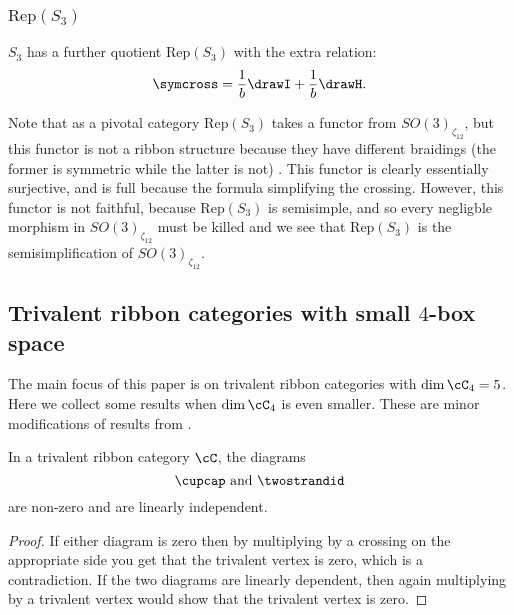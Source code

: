 \documentclass[12pt]{amsart}
\begin{document}
\subsubsection{$\text{Rep}(S_3)$}


\begin{definition}
$S_{3}$ has a further quotient $\mathrm{Rep}(S_3)$ with the extra relation:
$$\symcross = \frac{1}{b}\drawI + \frac{1}{b}\drawH.$$
\end{definition}

Note that as a pivotal category $\mathrm{Rep}(S_3)$ takes a functor from $SO(3)_{\zeta_{12}}$, but this functor is not a ribbon structure because they have different braidings (the former is symmetric while the latter is not) \cite[Ex. 8.6]{MR3624901}.  This functor is clearly essentially surjective, and is full because the formula simplifying the crossing.  However, this functor is not faithful, because $\mathrm{Rep}(S_3)$ is semisimple, and so every negligble morphism in $SO(3)_{\zeta_{12}}$ must be killed and we see that $\mathrm{Rep}(S_3)$ is the semisimplification of $SO(3)_{\zeta_{12}}$.

\subsection{Trivalent ribbon categories with small $4$-box space}

The main focus of this paper is on trivalent ribbon categories with $\dim \cC_4 = 5$.  Here we collect some results when $\dim \cC_4$ is even smaller.  These are minor modifications of results from \cite{MR3624901}.

\begin{lemma}
In a trivalent ribbon category $\cC$, the diagrams
$$\cupcap \text{ and } \twostrandid$$
are non-zero and are linearly independent.
\end{lemma}
\begin{proof}
If either diagram is zero then by multiplying by a crossing on the appropriate side you get that the trivalent vertex is zero, which is a contradiction.  If the two diagrams are linearly dependent, then again multiplying by a trivalent vertex would show that the trivalent vertex is zero.
\end{proof}

\end{document}
